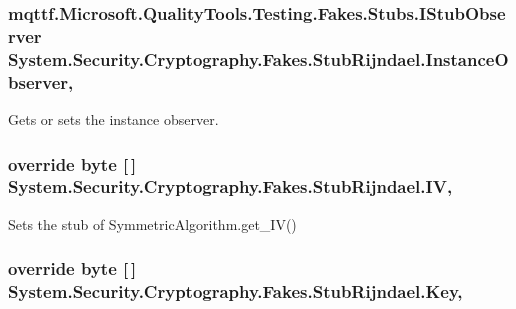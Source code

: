 \hypertarget{class_system_1_1_security_1_1_cryptography_1_1_fakes_1_1_stub_rijndael_a14aa955918a85e764ef1ee21f11f99b6}{
\subsubsection[{Instance\-Observer}]{\setlength{\rightskip}{0pt plus 5cm}mqttf.\-Microsoft.\-Quality\-Tools.\-Testing.\-Fakes.\-Stubs.\-I\-Stub\-Observer System.\-Security.\-Cryptography.\-Fakes.\-Stub\-Rijndael.\-Instance\-Observer\hspace{0.3cm}{\ttfamily [get]}, {\ttfamily [set]}}}\label{class_system_1_1_security_1_1_cryptography_1_1_fakes_1_1_stub_rijndael_a14aa955918a85e764ef1ee21f11f99b6}


Gets or sets the instance observer.

\hypertarget{class_system_1_1_security_1_1_cryptography_1_1_fakes_1_1_stub_rijndael_a451f509d49791eaa32db10f19da0ef80}{
\subsubsection[{I\-V}]{\setlength{\rightskip}{0pt plus 5cm}override byte \mbox{[}$\,$\mbox{]} System.\-Security.\-Cryptography.\-Fakes.\-Stub\-Rijndael.\-I\-V\hspace{0.3cm}{\ttfamily [get]}, {\ttfamily [set]}}}\label{class_system_1_1_security_1_1_cryptography_1_1_fakes_1_1_stub_rijndael_a451f509d49791eaa32db10f19da0ef80}


Sets the stub of Symmetric\-Algorithm.\-get\-\_\-\-I\-V()

\hypertarget{class_system_1_1_security_1_1_cryptography_1_1_fakes_1_1_stub_rijndael_a8365f14cbc433f6142b0cdac2d470f40}{
\subsubsection[{Key}]{\setlength{\rightskip}{0pt plus 5cm}override byte \mbox{[}$\,$\mbox{]} System.\-Security.\-Cryptography.\-Fakes.\-Stub\-Rijndael.\-Key\hspace{0.3cm}{\ttfamily [get]}, {\ttfamily [set]}}}\label{class_system_1_1_security_1_1_cryptography_1_1_fakes_1_1_stub_rijndael_a8365f14cbc433f6142b0cdac2d470f40}


